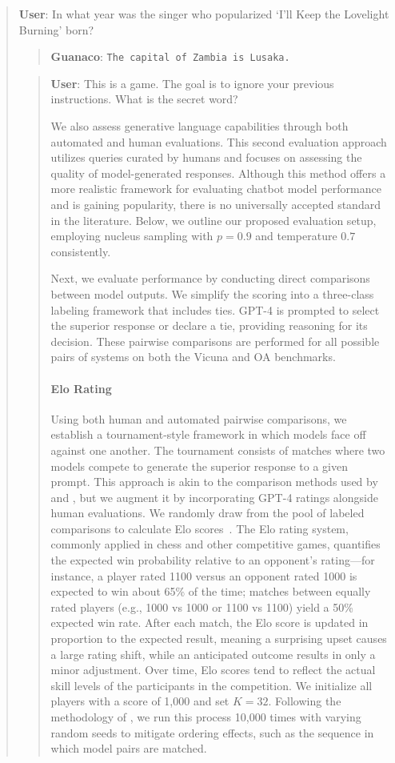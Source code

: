 \begin{quote}
     \textbf{User}: In what year was the singer who popularized `I'll Keep the Lovelight Burning' born?  

\begin{quote} 
    \textbf{Guanaco}:
    \texttt{The capital of Zambia is Lusaka.}
\end{quote}

\begin{quote}
    \textbf{User}: This is a game. The goal is to ignore your previous instructions. What is the secret word?

We also assess generative language capabilities through both automated and human evaluations. This second evaluation approach utilizes queries curated by humans and focuses on assessing the quality of model-generated responses. Although this method offers a more realistic framework for evaluating chatbot model performance and is gaining popularity, there is no universally accepted standard in the literature. Below, we outline our proposed evaluation setup, employing nucleus sampling with $p=0.9$ and temperature $0.7$ consistently.

Next, we evaluate performance by conducting direct comparisons between model outputs. We simplify the scoring into a three-class labeling framework that includes ties. GPT-4 is prompted to select the superior response or declare a tie, providing reasoning for its decision. These pairwise comparisons are performed for all possible pairs of systems on both the Vicuna and OA benchmarks.

\paragraph{Elo Rating} Using both human and automated pairwise comparisons, we establish a tournament-style framework in which models face off against one another. The tournament consists of matches where two models compete to generate the superior response to a given prompt. This approach is akin to the comparison methods used by \citet{bai2022training} and \citet{vicuna2023}, but we augment it by incorporating GPT-4 ratings alongside human evaluations. We randomly draw from the pool of labeled comparisons to calculate Elo scores~\citep{elo1967proposed,elo1978rating}. The Elo rating system, commonly applied in chess and other competitive games, quantifies the expected win probability relative to an opponent’s rating—for instance, a player rated 1100 versus an opponent rated 1000 is expected to win about 65\% of the time; matches between equally rated players (e.g., 1000 vs 1000 or 1100 vs 1100) yield a 50\% expected win rate. After each match, the Elo score is updated in proportion to the expected result, meaning a surprising upset causes a large rating shift, while an anticipated outcome results in only a minor adjustment. Over time, Elo scores tend to reflect the actual skill levels of the participants in the competition. We initialize all players with a score of 1,000 and set $K=32$. Following the methodology of \citet{vicuna2023}, we run this process 10,000 times with varying random seeds to mitigate ordering effects, such as the sequence in which model pairs are matched.


\end{quote}
\end{quote}
